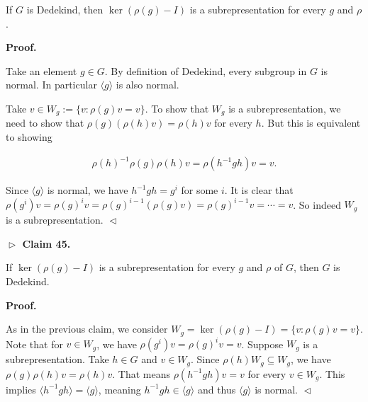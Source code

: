 \documentclass[10pt,a4paper]{article}
\begin{document}
If $G$ is Dedekind, then $\ker(\rho(g)-I)$ is a subrepresentation for every $g$ and $\rho$.\par






\par\medskip\noindent\textbf{
\textbf{Proof}.}\par




Take an element $g\in G$.
By definition of Dedekind, every subgroup in $G$ is normal.
In particular $\langle g\rangle$ is also normal.\par




Take $v\in W_{g}:=\{v:\rho(g)v=v\}$.
To show that $W_{g}$ is a subrepresentation, we need to show that $\rho(g)(\rho(h)v)=\rho(h)v$ for every $h$.
But this is equivalent to showing\par


\[\begin{gathered}
\rho(h)^{-1}\rho(g)\rho(h)v=\rho(h^{-1}gh)v=v.
\end{gathered}\]


Since $\langle g\rangle$ is normal, we have $h^{-1}gh=g^{i}$ for some $i$.
It is clear that $\rho(g^{i})v=\rho(g)^{i}v=\rho(g)^{i-1}(\rho(g)v)=\rho(g)^{i-1}v=\cdots=v$.
So indeed $W_{g}$ is a subrepresentation.
$\vartriangleleft$\par





\par\medskip\noindent\textbf{
$\vartriangleright$ Claim 45. }\par



If $\ker(\rho(g)-I)$ is a subrepresentation for every $g$ and $\rho$ of $G$, then $G$ is Dedekind.\par







\par\medskip\noindent\textbf{
\textbf{Proof}.}\par




As in the previous claim, we consider $W_{g}=\ker(\rho(g)-I)=\{v:\rho(g)v=v\}$.
Note that for $v\in W_{g}$, we have $\rho(g^{i})v=\rho(g)^{i}v=v$.
Suppose $W_{g}$ is a subrepresentation.
Take $h\in G$ and $v\in W_{g}$.
Since $\rho(h)W_{g}\subseteq W_{g}$, we have $\rho(g)\rho(h)v=\rho(h)v$.
That means $\rho(h^{-1}gh)v=v$ for every $v\in W_{g}$.
This implies $\langle h^{-1}gh\rangle=\langle g\rangle$, meaning $h^{-1}gh\in\langle g\rangle$ and thus $\langle g\rangle$ is normal.
$\vartriangleleft$\par
\end{document}
